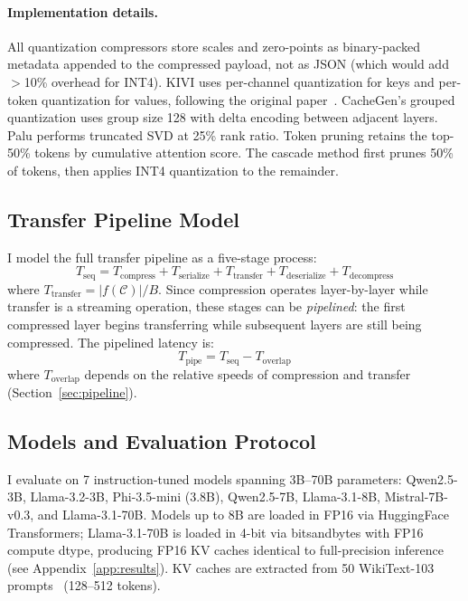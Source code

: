 \documentclass{article}
\begin{document}
\paragraph{Implementation details.} All quantization compressors store scales and zero-points as binary-packed metadata appended to the compressed payload, not as JSON (which would add $>$10\% overhead for INT4). KIVI uses per-channel quantization for keys and per-token quantization for values, following the original paper~\citep{liu2024kivi}. CacheGen's grouped quantization uses group size 128 with delta encoding between adjacent layers. Palu performs truncated SVD at 25\% rank ratio. Token pruning retains the top-50\% tokens by cumulative attention score. The cascade method first prunes 50\% of tokens, then applies INT4 quantization to the remainder.

\subsection{Transfer Pipeline Model}
\label{sec:pipeline_model}

I model the full transfer pipeline as a five-stage process:
\begin{equation}
T_{\text{seq}} = T_{\text{compress}} + T_{\text{serialize}} + T_{\text{transfer}} + T_{\text{deserialize}} + T_{\text{decompress}}
\label{eq:sequential}
\end{equation}
where $T_{\text{transfer}} = |f(\mathcal{C})| / B$. Since compression operates layer-by-layer while transfer is a streaming operation, these stages can be \emph{pipelined}: the first compressed layer begins transferring while subsequent layers are still being compressed. The pipelined latency is:
\begin{equation}
T_{\text{pipe}} = T_{\text{seq}} - T_{\text{overlap}}
\label{eq:pipelined}
\end{equation}
where $T_{\text{overlap}}$ depends on the relative speeds of compression and transfer (Section~\ref{sec:pipeline}).

\subsection{Models and Evaluation Protocol}

I evaluate on 7 instruction-tuned models spanning 3B--70B parameters: Qwen2.5-3B, Llama-3.2-3B, Phi-3.5-mini (3.8B), Qwen2.5-7B, Llama-3.1-8B, Mistral-7B-v0.3, and Llama-3.1-70B. Models up to 8B are loaded in FP16 via HuggingFace Transformers; Llama-3.1-70B is loaded in 4-bit via bitsandbytes with FP16 compute dtype, producing FP16 KV caches identical to full-precision inference (see Appendix~\ref{app:results}). KV caches are extracted from 50 WikiText-103 prompts~\citep{merity2017wikitext} (128--512 tokens).
\end{document}
